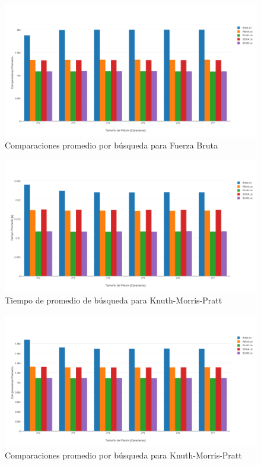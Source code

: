 \documentclass[14pt,letterpaper,hidelinks]{extarticle}
\begin{document}
		\begin{figure}[ht!]
			\centering
			\includegraphics[scale=0.5]{img/cBF.pdf}
			\caption{Comparaciones promedio por búsqueda para Fuerza Bruta} \label{construccion}
		\end{figure}

\newpage

		\begin{figure}[ht!]
			\centering
			\includegraphics[scale=0.5]{img/tKMP.pdf}
			\caption{Tiempo de promedio de búsqueda para Knuth-Morris-Pratt} \label{construccion}
		\end{figure}

	\newpage
		\begin{figure}[ht!]
			\centering
			\includegraphics[scale=0.5]{img/cKMP.pdf}
			\caption{Comparaciones promedio por búsqueda para Knuth-Morris-Pratt} \label{construccion}
		\end{figure}
\end{document}
